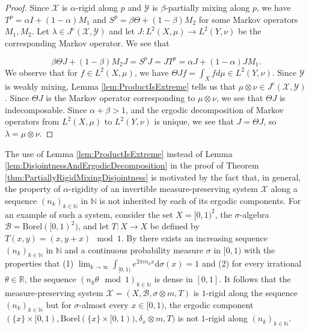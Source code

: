 \documentclass[graybox]{svmult}
\theoremstyle{definition}
\newcommand{\N}{\mathbb{N}}
\begin{document}
\begin{proof}
    Since $\mathcal{X}$ is $\alpha$-rigid along $p$ and $\mathcal{Y}$ is $\beta$-partially mixing along $p$, we have $T^p = \alpha I+(1-\alpha)M_1$ and $S^p = \beta\Theta+(1-\beta)M_2$ for some Markov operators $M_1,M_2$.
    Let $\lambda \in J^e(\mathcal{X},\mathcal{Y})$ and let $J:L^2(X,\mu)\rightarrow L^2(Y,\nu)$ be the corresponding Markov operator.
    We see that 

    \begin{equation}
        \beta\Theta J+(1-\beta)M_2J = S^pJ = JT^p = \alpha J+(1-\alpha)JM_1.
    \end{equation}
    We observe that for $f \in L^2(X,\mu)$, we have $\Theta Jf = \int_Xfd\mu \in L^2(Y,\nu)$.
    Since $\mathcal{Y}$ is weakly mixing, Lemma \ref{lem:ProductIsExtreme} tells us that $\mu\otimes\nu \in J^e(\mathcal{X},\mathcal{Y})$.
    Since $\Theta J$ is the Markov operator corresponding to $\mu\otimes\nu$, we see that $\Theta J$ is indecomposable. 
    Since $\alpha+\beta > 1$, and the ergodic decomposition of Markov operators from $L^2(X,\mu)$ to $L^2(Y,\nu)$ is unique, we see that $J = \Theta J$, so $\lambda = \mu\otimes\nu$.  
\end{proof}
\begin{remark}
The use of Lemma \ref{lem:ProductIsExtreme} instead of Lemma \ref{lem:DisjointnessAndErgodicDecomposition} in the proof of Theorem \ref{thm:PartiallyRigidMixingDisjointness} is motivated by the fact that,  in general, the property of $\alpha$-rigidity of an invertible measure-preserving system $\mathcal X$ along a sequence $(n_k)_{k\in\N}$ in $\N$ is not inherited by each of its ergodic components.
For an example of such a system, consider the set  $X=[0,1)^2$, the $\sigma$-algebra $\mathcal B=\text{Borel}([0,1)^2)$, and let $T:X\rightarrow X$ be defined by $T(x,y)=(x,y+x)\mod 1$. 
By \cite[Theorem 2]{fayad2015rigidityNonTorusRecurrent} there exists an increasing sequence $(n_k)_{k\in\N}$ in $\N$ and a continuous probability measure $\sigma$ in $[0,1)$ with the properties that (1) $\lim_{k\rightarrow\infty}\int_{[0,1)}e^{2\pi in_kx}\text{d}\sigma(x)=1$ and (2) for every irrational $\theta\in \mathbb R$, the sequence  $(n_k\theta\mod 1)_{k\in\N}$ is dense in $[0,1]$.
It follows that the measure-preserving system $\mathcal X=(X, \mathcal B,\sigma\otimes m, T)$ is $1$-rigid along the sequence $(n_k)_{k\in\N}$ but for $\sigma$-almost every $x\in [0,1)$, the ergodic component $(\{x\}\times [0,1), \text{Borel}(\{x\}\times[0,1)),\delta_x\otimes m, T)$ is not $1$-rigid along $(n_k)_{k\in\N}$.
\end{remark}
\end{document}
